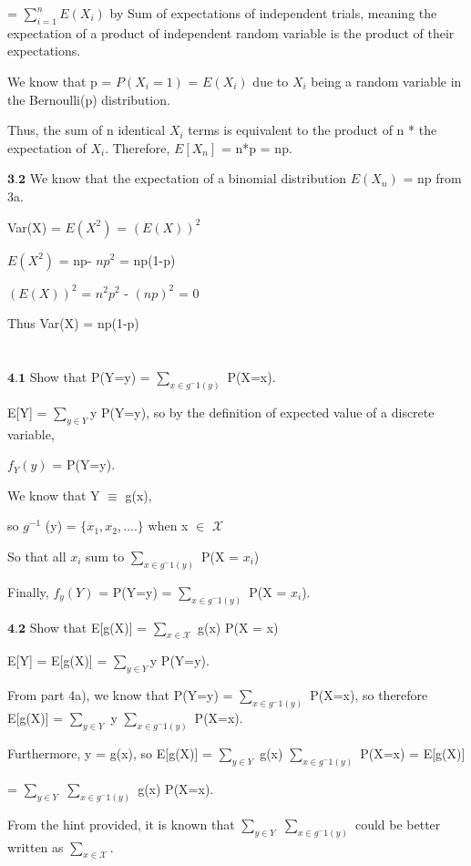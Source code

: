 =  $\sum_{i=1}^nE({X_i})$ by Sum of expectations of independent trials, meaning the expectation of a product of independent random variable is the product of their expectations.

We know that p = $P(X_i = 1)$ = $E(X_i)$ due  to $X_i$ being a random variable in the Bernoulli(p) distribution.

Thus, the sum of n identical $X_i$ terms is equivalent to the product of n * the expectation of $X_i$. Therefore, $E[X_n]$ = n*p = np.

$\textbf{3.2}$ We know that the expectation of a binomial distribution $E(X_n)$ = np from 3a.

Var(X) = $E(X^2)$ = $(E(X))^2$

$E(X^2)$ = np- $np^2$ = np(1-p)

$(E(X))^2$ = $n^2p^2$ - $(np)^2$ = 0

Thus Var(X) = np(1-p)


\newpage
\section{}

$\textbf{4.1}$ Show that P(Y=y) = $\sum_{x\in g^-1(y)}$ P(X=x).

E[Y] = $\sum_{y\in Y}$y P(Y=y), so by the definition of expected value of a discrete variable, 

$f_Y(y)$ = P(Y=y).

We know that Y $\equiv$ g(x), 

so $g^{-1}$ (y) = $\{x_1,x_2,....\}$ when x $\in$ $\mathcal{X}$

So that all $x_i$ sum to $\sum_{x\in g^-1(y)}$ P(X = $x_i$)

Finally, $f_y(Y)$ = P(Y=y) = $\sum_{x\in g^-1(y)}$ P(X = $x_i$).


$\textbf{4.2}$ Show that E[g(X)] = $\sum_{x\in \mathcal{X}}$ g(x) P(X = x)

E[Y] = E[g(X)] = $\sum_{y\in Y}$y P(Y=y).

From part 4a), we know that P(Y=y) = $\sum_{x\in g^-1(y)}$ P(X=x), so therefore E[g(X)] = $\sum_{y\in Y}$ y $\sum_{x\in g^-1(y)}$ P(X=x). 

Furthermore, y = g(x), so  E[g(X)] = $\sum_{y\in Y}$ g(x) $\sum_{x\in g^-1(y)}$ P(X=x) = E[g(X)] 

= $\sum_{y\in Y}$ $\sum_{x\in g^-1(y)}$  g(x) P(X=x).

From the hint provided, it is known that $\sum_{y\in Y}$ $\sum_{x\in g^-1(y)}$ could be better written as $\sum_{x\in \mathcal{X}}$.

